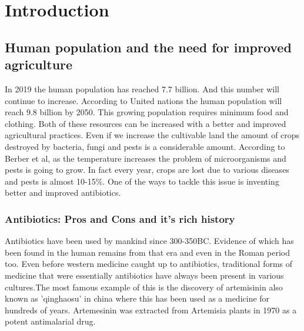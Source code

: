 \chapter{Introduction}
\label{chap:introduction}
\section{Human population and the need for improved agriculture}
In 2019 the human population has reached 7.7 billion. And this number will continue to increase.
According to United nations the human population will reach 9.8 billion by 2050.
This growing population requires minimum food and clothing.
Both of these resources can be increased with a better and improved agricultural practices. 
Even if we increase the cultivable land the amount of crops destroyed by bacteria, fungi and
pests is a considerable amount. According to Berber et al, as the temperature increases the problem of microorganisms and pests is going to grow.\cite{Gurr2013} 
In fact every year, crops are lost due to various diseases and pests is almost 10-15\%.
One of the ways to tackle this issue is inventing better and improved antibiotics. 

\subsection{Antibiotics: Pros and Cons and it's rich history}
Antibiotics have been used by mankind since 300-350BC. Evidence of which has been found in the 
human remains from that era and even in the Roman period too. \cite{Armelagos2010, 
Villanueva1980, Anderson1989} 
Even before western medicine caught up to antibiotics, traditional forms 
of medicine that were essentially antibiotics have always been present 
in various cultures.\cite{Aminov2010}The most famous example of this is 
the discovery of  artemisinin also known as 'qinghaosu' in china where 
this has been used as a medicine for hundreds of years. Artemesinin was 
extracted from  Artemisia plants in 1970 as a potent antimalarial 
drug.\cite{Su2009}

